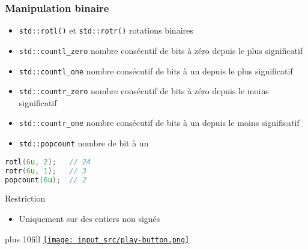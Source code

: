 \documentclass[C++.tex]{subfiles}
\begin{document}
\begin{frame}[fragile]
	\frametitle{Manipulation binaire}
	\begin{itemize}
		\item \lstinline|std::rotl()| et \lstinline|std::rotr()| rotations binaires


		\item \lstinline|std::countl_zero| nombre consécutif de bits à zéro depuis le plus significatif
		\item \lstinline|std::countl_one| nombre consécutif de bits à un depuis le plus significatif
		\item \lstinline|std::countr_zero| nombre consécutif de bits à zéro depuis le moins significatif
		\item \lstinline|std::countr_one| nombre consécutif de bits à un depuis le moins significatif
		\item \lstinline|std::popcount| nombre de bit à un
	\end{itemize}

	\begin{lstlisting}[language=C++]
rotl(6u, 2);   // 24
rotr(6u, 1);   // 3
popcount(6u);  // 2\end{lstlisting}

	\begin{alertblock}{Restriction}
		\begin{itemize}
			\item Uniquement sur des entiers non signés
		\end{itemize}
	\end{alertblock}

	\vskip 10mm plus 10fill
	\hfill
	\href{https://godbolt.org/#g:!((g:!((g:!((h:codeEditor,i:(filename:'1',fontScale:14,fontUsePx:'0',j:1,lang:c%2B%2B,selection:(endColumn:3,endLineNumber:6,positionColumn:3,positionLineNumber:6,selectionStartColumn:3,selectionStartLineNumber:6,startColumn:3,startLineNumber:6),source:'%23include+%3Ciostream%3E%0A%23include+%3Cbit%3E%0A%0Aint+main()%0A%7B%0A++std::cout+%3C%3C+std::rotl(6u,+2)+%3C%3C+%22%5Cn%22%3B%0A++std::cout+%3C%3C+std::rotr(6u,+1)+%3C%3C+%22%5Cn%22%3B%0A++std::cout+%3C%3C+std::popcount(6u)+%3C%3C+%22%5Cn%22%3B%0A%7D%0A'),l:'5',n:'0',o:'C%2B%2B+source+%231',t:'0')),k:50,l:'4',n:'0',o:'',s:0,t:'0'),(g:!((h:executor,i:(argsPanelShown:'1',compilationPanelShown:'0',compiler:g112,compilerOutShown:'0',execArgs:'',execStdin:'',fontScale:14,fontUsePx:'0',j:1,lang:c%2B%2B,libs:!((name:boost,ver:'175')),options:'-std%3Dc%2B%2B20',source:1,stdinPanelShown:'1',tree:'1',wrap:'0'),l:'5',n:'0',o:'Executor+x86-64+gcc+11.2+(C%2B%2B,+Editor+%231)',t:'0')),header:(),k:50,l:'4',n:'0',o:'',s:0,t:'0')),l:'2',n:'0',o:'',t:'0')),version:4}{\texttt{[image: input\_src/play-button.png]}}
\end{frame}
\end{document}
